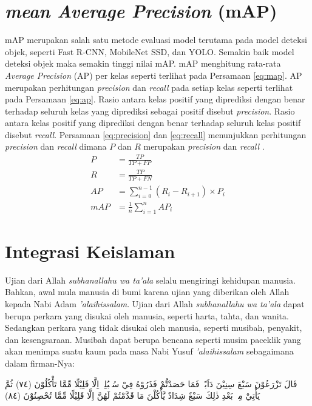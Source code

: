 \section{\textit{mean Average Precision} (mAP)}
mAP merupakan salah satu metode evaluasi model terutama pada model deteksi objek, seperti Fast R-CNN, MobileNet SSD, dan YOLO. Semakin baik model deteksi objek maka semakin tinggi nilai mAP. mAP menghitung rata-rata \textit{Average Precision} (AP) per kelas seperti terlihat pada Persamaan \ref{eq:map}. AP merupakan perhitungan \textit{precision} dan \textit{recall} pada setiap kelas seperti terlihat pada Persamaan \ref{eq:ap}. Rasio antara kelas positif yang diprediksi dengan benar terhadap seluruh kelas yang diprediksi sebagai positif disebut \textit{precision}. Rasio antara kelas positif yang diprediksi dengan benar terhadap seluruh kelas positif disebut \textit{recall}. Persamaan \ref{eq:precision} dan \ref{eq:recall} menunjukkan perhitungan \textit{precision} dan \textit{recall} dimana $P$ dan $R$ merupakan \textit{precision} dan \textit{recall} \citep{Shultz2017}.
\begin{align}
    \label{eq:precision}
    P &= \frac{TP}{TP+FP}\\
    \label{eq:recall}
    R &= \frac{TP}{TP+FN}\\
    \label{eq:ap}
    AP &= \sum_{i=0}^{n-1} (R_i-R_{i+1})\times P_i\\
    \label{eq:map}
    mAP &= \frac{1}{n}\sum_{i=1}^{n} AP_i
\end{align}

\section{Integrasi Keislaman}
Ujian dari Allah \textit{subhanallahu wa ta'ala} selalu mengiringi kehidupan manusia. Bahkan, awal mula manusia di bumi karena ujian yang diberikan oleh Allah kepada Nabi Adam \textit{'alaihissalam}. Ujian dari Allah \textit{subhanallahu wa ta'ala} dapat berupa perkara yang disukai oleh manusia, seperti harta, tahta, dan wanita. Sedangkan perkara yang tidak disukai oleh manusia, seperti musibah, penyakit, dan kesengsaraan. Musibah dapat berupa bencana seperti musim paceklik yang akan menimpa suatu kaum pada masa Nabi Yusuf \textit{'alaihissalam} sebagaimana dalam firman-Nya:

\begin{flushright}
    \begin{RLtext}
        قَالَ تَزْرَعُوْنَ سَبْعَ سِنِيْنَ دَاَبًاۚ فَمَا حَصَدْتُّمْ فَذَرُوْهُ فِيْ سُنْۢبُلِهٖٓ اِلَّا قَلِيْلًا مِّمَّا تَأْكُلُوْنَ (٧٤) ثُمَّ يَأْتِيْ مِنْۢ بَعْدِ ذٰلِكَ سَبْعٌ شِدَادٌ يَّأْكُلْنَ مَا قَدَّمْتُمْ لَهُنَّ اِلَّا قَلِيْلًا مِّمَّا تُحْصِنُوْنَ (٨٤)
    \end{RLtext}
\end{flushright}

